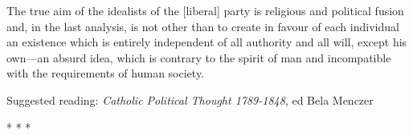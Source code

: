 \begin{quotex}
The true aim of the idealists of the [liberal] party is religious and political fusion and, in the last analysis, is not other than to create in favour of each individual an existence which is entirely independent of all authority and all will, except his own—an absurd idea, which is contrary to the spirit of man and incompatible with the requirements of human society. 

\end{quotex}

\hfill

Suggested reading: \emph{Catholic Political Thought 1789-1848}, ed Bela Menczer 




\begin{center}* * *\end{center}

